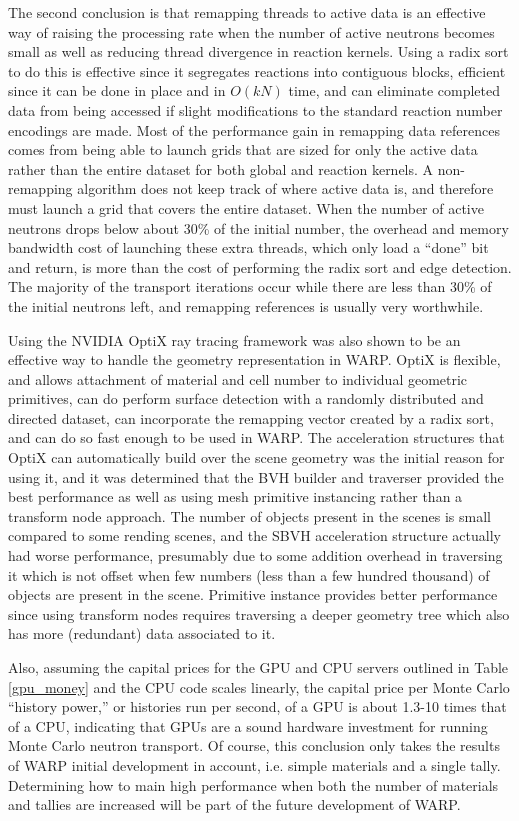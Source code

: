 The second conclusion is that remapping threads to active data is an effective way of raising the processing rate when the number of active neutrons becomes small as well as reducing thread divergence in reaction kernels.  Using a radix sort to do this is effective since it segregates reactions into contiguous blocks, efficient since it can be done in place and in $O(kN)$ time, and can eliminate completed data from being accessed if slight modifications to the standard reaction number encodings are made.  Most of the performance gain in remapping data references comes from being able to launch grids that are sized for only the active data rather than the entire dataset for both global and reaction kernels.  A non-remapping algorithm does not keep track of where active data is, and therefore must launch a grid that covers the entire dataset.  When the number of active neutrons drops below about 30\% of the initial number, the overhead and memory bandwidth cost of launching these extra threads, which only load a ``done'' bit and return, is more than the cost of performing the radix sort and edge detection.  The majority of the transport iterations occur  while there are less than 30\% of the initial neutrons left, and remapping references is usually very worthwhile.

Using the NVIDIA OptiX ray tracing framework was also shown to be an effective way to handle the geometry representation in WARP.  OptiX is flexible, and allows attachment of material and cell number to individual geometric primitives, can do perform surface detection with a randomly distributed and directed dataset, can incorporate the remapping vector created by a radix sort, and can do so fast enough to be used in WARP.  The acceleration structures that OptiX can automatically build over the scene geometry was the initial reason for using it, and it was determined that the BVH builder and traverser provided the best performance as well as using mesh primitive instancing rather than a transform node approach.  The number of objects present in the scenes is small compared to some rending scenes, and the SBVH acceleration structure actually had worse performance, presumably due to some addition overhead in traversing it which is not offset when few numbers (less than a few hundred thousand) of objects are present in the scene.  Primitive instance provides better performance since using transform nodes requires traversing a deeper geometry tree which also has more (redundant) data associated to it.

Also, assuming the capital prices for the GPU and CPU servers outlined in Table \ref{gpu_money} and the CPU code scales linearly, the capital price per Monte Carlo ``history power,'' or histories run per second, of a GPU is about 1.3-10 times that of a CPU, indicating that GPUs are a sound hardware investment for running Monte Carlo neutron transport.  Of course, this conclusion only takes the results of WARP initial development in account, i.e. simple materials and a single tally.  Determining how to main high performance when both the number of materials and tallies are increased will be part of the future development of WARP.

